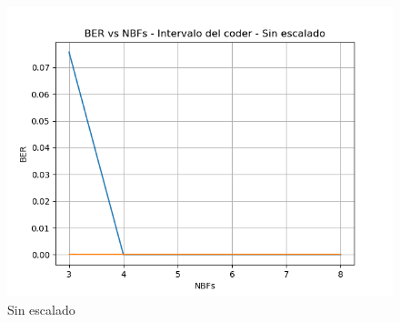 \begin{frame}
\begin{columns}
\begin{column}{0.48\paperwidth}
\begin{figure}
    \includegraphics[width=\textwidth]{Graficos/cuantization5.png}%
    \caption{Sin escalado}
    \end{figure}
    \end{column}
\end{columns}
   \end{frame}

